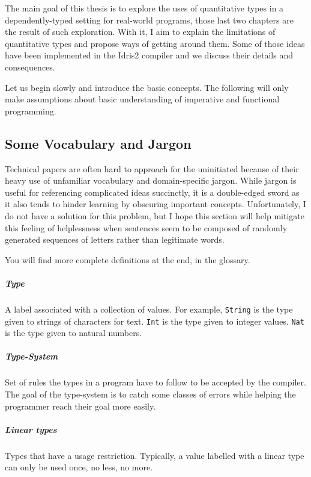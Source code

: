 \documentclass[
]{article}
\begin{document}
The main goal of this thesis is to explore the uses of quantitative
types in a dependently-typed setting for real-world programs, those last
two chapters are the result of such exploration. With it, I aim to
explain the limitations of quantitative types and propose ways of
getting around them. Some of those ideas have been implemented in the
Idris2 compiler and we discuss their details and consequences.

Let us begin slowly and introduce the basic concepts. The following will
only make assumptions about basic understanding of imperative and
functional programming.

\hypertarget{some-vocabulary-and-jargon}{%
\subsection{Some Vocabulary and
Jargon}\label{some-vocabulary-and-jargon}}

Technical papers are often hard to approach for the uninitiated because
of their heavy use of unfamiliar vocabulary and domain-specific jargon.
While jargon is useful for referencing complicated ideas succinctly, it
is a double-edged sword as it also tends to hinder learning by obscuring
important concepts. Unfortunately, I do not have a solution for this
problem, but I hope this section will help mitigate this feeling of
helplessness when sentences seem to be composed of randomly generated
sequences of letters rather than legitimate words.

You will find more complete definitions at the end, in the glossary.

\hypertarget{type}{%
\subparagraph{Type}\label{type}}

A label associated with a collection of values. For example,
\texttt{String} is the type given to strings of characters for text.
\texttt{Int} is the type given to integer values. \texttt{Nat} is the
type given to natural numbers.

\hypertarget{type-system}{%
\subparagraph{Type-System}\label{type-system}}

Set of rules the types in a program have to follow to be accepted by the
compiler. The goal of the type-system is to catch some classes of errors
while helping the programmer reach their goal more easily.

\hypertarget{linear-types}{%
\subparagraph{Linear types}\label{linear-types}}

Types that have a usage restriction. Typically, a value labelled with a
linear type can only be used once, no less, no more.
\end{document}
